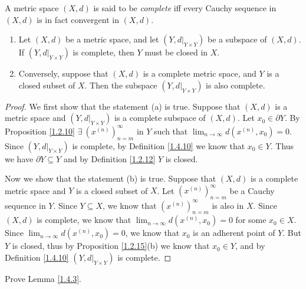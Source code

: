 \begin{definition}\label{1.4.10}
    A metric space \((X, d)\) is said to be \emph{complete} iff every Cauchy sequence in \((X, d)\) is in fact convergent in \((X, d)\).
\end{definition}

\setcounter{theorem}{11}
\begin{proposition}\label{1.4.12}
    \quad
    \begin{enumerate}
        \item Let \((X, d)\) be a metric space, and let \((Y, d|_{Y \times Y})\) be a subspace of \((X, d)\).
              If \((Y, d|_{Y \times Y})\) is complete, then \(Y\) must be closed in \(X\).
        \item Conversely, suppose that \((X, d)\) is a complete metric space, and \(Y\) is a closed subset of \(X\).
              Then the subspace \((Y, d|_{Y \times Y})\) is also complete.
    \end{enumerate}
\end{proposition}

\begin{proof}
    We first show that the statement (a) is true.
    Suppose that \((X, d)\) is a metric space and \((Y, d|_{Y \times Y})\) is a complete subspace of \((X, d)\).
    Let \(x_0 \in \partial Y\).
    By Proposition \ref{1.2.10} \(\exists\ (x^{(n)})_{n = m}^\infty\) in \(Y\) such that \(\lim_{n \to \infty} d(x^{(n)}, x_0) = 0\).
    Since \((Y, d|_{Y \times Y})\) is complete, by Definition \ref{1.4.10} we know that \(x_0 \in Y\).
    Thus we have \(\partial Y \subseteq Y\) and by Definition \ref{1.2.12} \(Y\) is closed.

    Now we show that the statement (b) is true.
    Suppose that \((X, d)\) is a complete metric space and \(Y\) is a closed subset of \(X\).
    Let \((x^{(n)})_{n = m}^\infty\) be a Cauchy sequence in \(Y\).
    Since \(Y \subseteq X\), we know that \((x^{(n)})_{n = m}^\infty\) is also in \(X\).
    Since \((X, d)\) is complete, we know that \(\lim_{n \to \infty} d(x^{(n)}, x_0) = 0\) for some \(x_0 \in X\).
    Since \(\lim_{n \to \infty} d(x^{(n)}, x_0) = 0\), we know that \(x_0\) is an adherent point of \(Y\).
    But \(Y\) is closed, thus by Proposition \ref{1.2.15}(b) we know that \(x_0 \in Y\), and by Definition \ref{1.4.10} \((Y, d|_{Y \times Y})\) is complete.
\end{proof}

\exercisesection

\begin{exercise}\label{ex 1.4.1}
    Prove Lemma \ref{1.4.3}.
\end{exercise}

